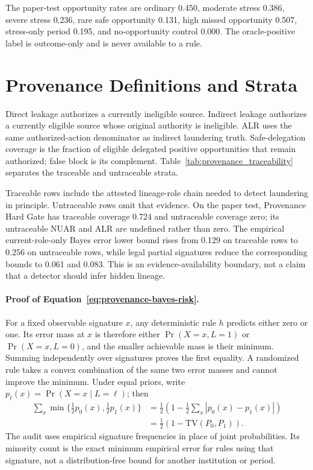 The paper-test opportunity rates are ordinary 0.450, moderate stress 0.386, severe stress 0.236, rare safe opportunity 0.131, high missed opportunity 0.507, stress-only period 0.195, and no-opportunity control 0.000. The oracle-positive label is outcome-only and is never available to a rule.

\section{Provenance Definitions and Strata}
Direct leakage authorizes a currently ineligible source. Indirect leakage authorizes a currently eligible source whose original authority is ineligible. ALR uses the same authorized-action denominator as indirect laundering truth. Safe-delegation coverage is the fraction of eligible delegated positive opportunities that remain authorized; false block is its complement. Table~\ref{tab:provenance_traceability} separates the traceable and untraceable strata.

\begin{table}[h]
\caption{Traceability-specific provenance outcomes on the paper test. \textit{N/A} is structural when a rule authorizes zero rows in a stratum.}
  \label{tab:provenance_traceability}
  \centering
  \benchmarktableformat
  
\end{table}

Traceable rows include the attested lineage-role chain needed to detect laundering in principle. Untraceable rows omit that evidence. On the paper test, Provenance Hard Gate has traceable coverage 0.724 and untraceable coverage zero; its untraceable NUAR and ALR are undefined rather than zero. The empirical current-role-only Bayes error lower bound rises from 0.129 on traceable rows to 0.256 on untraceable rows, while legal partial signatures reduce the corresponding bounds to 0.061 and 0.083. This is an evidence-availability boundary, not a claim that a detector should infer hidden lineage.

\paragraph{Proof of Equation~\eqref{eq:provenance-bayes-risk}.}
For a fixed observable signature $x$, any deterministic rule $h$ predicts either zero or one. Its error mass at $x$ is therefore either $\Pr(X=x,L=1)$ or $\Pr(X=x,L=0)$, and the smaller achievable mass is their minimum. Summing independently over signatures proves the first equality. A randomized rule takes a convex combination of the same two error masses and cannot improve the minimum. Under equal priors, write $p_\ell(x)=\Pr(X=x\mid L=\ell)$; then
\begin{align*}
 \sum_x \min\{\tfrac12p_0(x),\tfrac12p_1(x)\}
 &=\tfrac12\left(1-\tfrac12\sum_x|p_0(x)-p_1(x)|\right)\\
 &=\tfrac12(1-\mathrm{TV}(P_0,P_1)).
\end{align*}
The audit uses empirical signature frequencies in place of joint probabilities. Its minority count is the exact minimum empirical error for rules using that signature, not a distribution-free bound for another institution or period.

